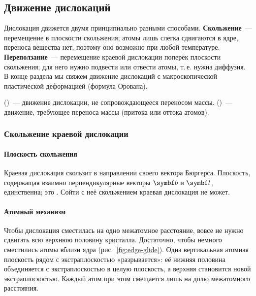 \subsection{Движение дислокаций}\label{ssec:disl-motion}

\begin{orientir}
Дислокация движется двумя принципиально разными способами.
\textbf{Скольжение}~— перемещение в плоскости скольжения; атомы лишь
слегка сдвигаются в ядре, переноса вещества нет, поэтому оно возможно
при любой температуре. \textbf{Переползание}~— перемещение краевой
дислокации поперёк плоскости скольжения; для него нужно подвести или
отвести атомы, т.\,е. нужна диффузия. В конце раздела мы свяжем движение
дислокаций с макроскопической пластической деформацией (формула
Орована).
\end{orientir}

\begin{opredelenie}
 ()~— движение дислокации,
не сопровождающееся переносом массы. 
()~— движение, требующее переноса массы (притока или
оттока атомов).
\end{opredelenie}

\subsubsection{Скольжение краевой дислокации}

\paragraph{Плоскость скольжения}
Краевая дислокация скользит в направлении своего вектора Бюргерса.
Плоскость, содержащая взаимно перпендикулярные векторы $\vb b$ и $\vb t$,
единственна; это . Сойти с неё скольжением
краевая дислокация не может.

\paragraph{Атомный механизм}
Чтобы дислокация сместилась на одно межатомное расстояние, вовсе не нужно
сдвигать всю верхнюю половину кристалла. Достаточно, чтобы немного
сместились атомы вблизи ядра (рис.~\ref{fig:edge-glide}). Одна
вертикальная атомная плоскость рядом с экстраплоскостью «разрывается»:
её нижняя половина объединяется с экстраплоскостью в целую плоскость, а
верхняя становится новой экстраплоскостью. Каждый атом при этом
смещается лишь на долю межатомного расстояния.

